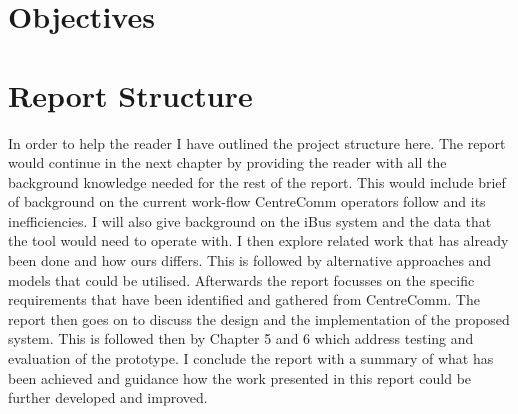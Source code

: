 \section{Objectives}

\section{Report Structure}
In order to help the reader I have outlined the project structure here. The report would continue in the next chapter by providing the reader with all the background knowledge needed for the rest of the report. This would include brief of background on the current work-flow CentreComm operators follow and its inefficiencies. I will also give background on the iBus system and the data that the tool would need to operate with. I then explore related work that has already been done and how ours differs. This is followed by alternative approaches and models that could be utilised. Afterwards the report focusses on the specific requirements that have been identified and gathered from CentreComm. The report then goes on to discuss the design and the implementation of the proposed system. This is followed then by Chapter 5 and 6 which address testing and evaluation of the prototype. I conclude the report with a summary of what has been achieved and guidance how the work presented in this report could be further developed and improved.